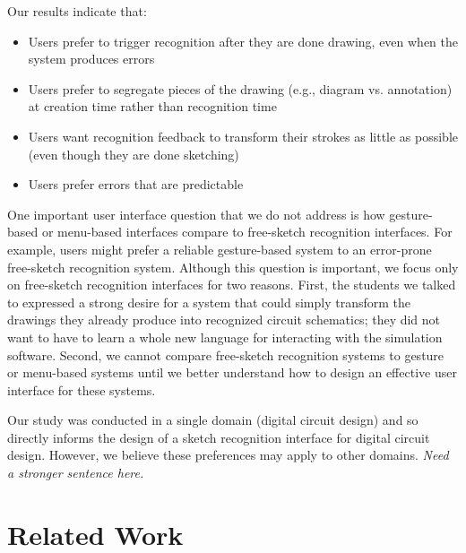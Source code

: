 \documentclass{egpubl}
\begin{document}
Our results indicate that:
\begin{itemize}
\item Users prefer to trigger recognition after they are done drawing,
  even when the system produces errors
\item Users prefer to segregate pieces of the drawing (e.g., diagram
  vs. annotation) at creation time rather than recognition time
\item Users want recognition feedback to transform their strokes as
  little as possible (even though they are done sketching)
\item Users prefer errors that are predictable
\end{itemize}

One important user interface question that we do not address is how
gesture-based or menu-based interfaces compare to free-sketch
recognition interfaces.  For example, users might prefer a reliable
gesture-based system to an error-prone free-sketch recognition system.
Although this question is important, we focus only on free-sketch
recognition interfaces for two reasons.  First, the students we talked
to expressed a strong desire for a system that could simply transform
the drawings they already produce into recognized circuit schematics;
they did not want to have to learn a whole new language for
interacting with the simulation software.  Second, we cannot compare
free-sketch recognition systems to gesture or menu-based systems until
we better understand how to design an effective user interface for
these systems.

Our study was conducted in a single domain (digital circuit design)
and so directly informs the design of a sketch recognition interface
for digital circuit design.  However, we believe these preferences may
apply to other domains.  \emph{Need a stronger sentence here.}


\section{Related Work}

\end{document}
